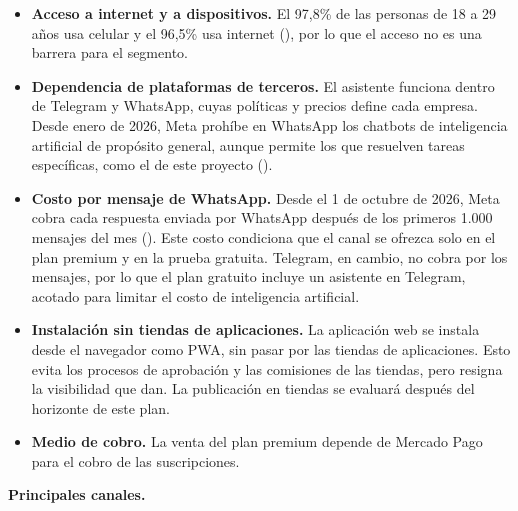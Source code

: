 \begin{itemize}
\tightlist
\item
  \textbf{Acceso a internet y a dispositivos.} El 97,8\% de las personas
  de 18 a 29 años usa celular y el 96,5\% usa internet
  (), por lo que el acceso no es una barrera para el
  segmento.
\item
  \textbf{Dependencia de plataformas de terceros.} El asistente funciona
  dentro de Telegram y WhatsApp, cuyas políticas y precios define cada
  empresa. Desde enero de 2026, Meta prohíbe en WhatsApp los chatbots de
  inteligencia artificial de propósito general, aunque permite los que
  resuelven tareas específicas, como el de este proyecto
  ().
\item
  \textbf{Costo por mensaje de WhatsApp.} Desde el 1 de octubre de 2026,
  Meta cobra cada respuesta enviada por WhatsApp después de los primeros
  1.000 mensajes del mes ().
  Este costo condiciona que el canal se ofrezca solo en el plan premium
  y en la prueba gratuita. Telegram, en cambio, no cobra por los
  mensajes, por lo que el plan gratuito incluye un asistente en
  Telegram, acotado para limitar el costo de inteligencia artificial.
\item
  \textbf{Instalación sin tiendas de aplicaciones.} La aplicación web se
  instala desde el navegador como PWA, sin pasar por las tiendas de
  aplicaciones. Esto evita los procesos de aprobación y las comisiones
  de las tiendas, pero resigna la visibilidad que dan. La publicación en
  tiendas se evaluará después del horizonte de este plan.
\item
  \textbf{Medio de cobro.} La venta del plan premium depende de Mercado
  Pago para el cobro de las suscripciones.
\end{itemize}

\textbf{Principales canales.}

